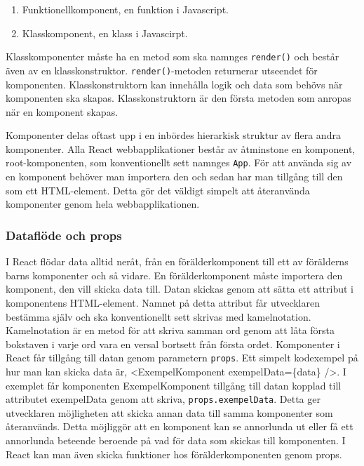 \begin{enumerate}
    \item Funktionellkomponent, en funktion i Javascript.
    \item Klasskomponent, en klass i Javascirpt.
\end{enumerate}

Klasskomponenter måste ha en metod som ska namnges \texttt{render()} och består även av en klasskonstruktor. \texttt{render()}-metoden returnerar utseendet för komponenten. Klasskonstruktorn kan innehålla logik och data som behövs när komponenten ska skapas. Klasskonstruktorn är den första metoden som anropas när en komponent skapas.

Komponenter delas oftast upp i en inbördes hierarkisk struktur av flera andra komponenter. Alla React webbapplikationer består av åtminstone en komponent, root-komponenten, som konventionellt sett namnges \texttt{App}. För att använda sig av en komponent behöver man importera den och sedan har man tillgång till den som ett HTML-element. Detta gör det väldigt simpelt att återanvända komponenter genom hela webbapplikationen.


\subsubsection{Dataflöde och props}
I React flödar data alltid neråt\cite{react-states}, från en förälderkomponent till ett av förälderns barns komponenter och så vidare. En förälderkomponent måste importera den komponent, den vill skicka data till. Datan skickas genom att sätta ett attribut i komponentens HTML-element. Namnet på detta attribut får utvecklaren bestämma själv och ska konventionellt sett skrivas med kamelnotation. Kamelnotation är en metod för att skriva samman ord genom att låta första bokstaven i varje ord vara en versal bortsett från första ordet. Komponenter i React får tillgång till datan genom parametern \texttt{props}. Ett simpelt kodexempel på hur man kan skicka data är, <ExempelKomponent exempelData=\{data\} />. I exemplet får komponenten ExempelKomponent tillgång till datan kopplad till attributet exempelData genom att skriva, \texttt{props.exempelData}. Detta ger utvecklaren möjligheten att skicka annan data till samma komponenter som återanvänds. Detta möjliggör att en komponent kan se annorlunda ut eller få ett annorlunda beteende beroende på vad för data som skickas till komponenten. I React kan man även skicka funktioner hos förälderkomponenten genom props. 

